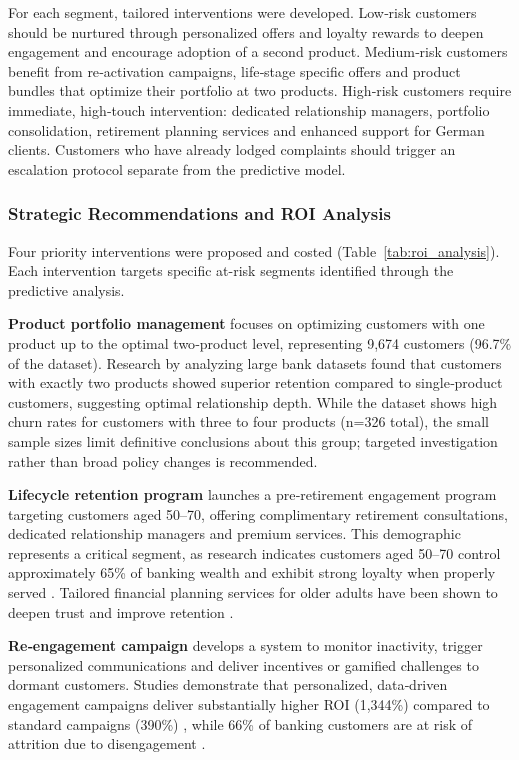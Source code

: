 \documentclass[12pt]{article}
\begin{document}
For each segment, tailored interventions were developed. Low‑risk customers should be nurtured through personalized offers and loyalty rewards to deepen engagement and encourage adoption of a second product. Medium‑risk customers benefit from re‑activation campaigns, life‑stage specific offers and product bundles that optimize their portfolio at two products. High‑risk customers require immediate, high‑touch intervention: dedicated relationship managers, portfolio consolidation, retirement planning services and enhanced support for German clients. Customers who have already lodged complaints should trigger an escalation protocol separate from the predictive model.

\subsubsection{Strategic Recommendations and ROI Analysis}
Four priority interventions were proposed and costed (Table~\ref{tab:roi_analysis}). Each intervention targets specific at-risk segments identified through the predictive analysis.

\textbf{Product portfolio management} focuses on optimizing customers with one product up to the optimal two‑product level, representing 9,674 customers (96.7\% of the dataset). Research by \citet{singh2024productchurn} analyzing large bank datasets found that customers with exactly two products showed superior retention compared to single‑product customers, suggesting optimal relationship depth. While the dataset shows high churn rates for customers with three to four products (n=326 total), the small sample sizes limit definitive conclusions about this group; targeted investigation rather than broad policy changes is recommended.

\textbf{Lifecycle retention program} launches a pre‑retirement engagement program targeting customers aged 50–70, offering complimentary retirement consultations, dedicated relationship managers and premium services. This demographic represents a critical segment, as research indicates customers aged 50–70 control approximately 65\% of banking wealth and exhibit strong loyalty when properly served \citep{marr2024aging}. Tailored financial planning services for older adults have been shown to deepen trust and improve retention \citep{ncrc2021agefriendly}.

\textbf{Re‑engagement campaign} develops a system to monitor inactivity, trigger personalized communications and deliver incentives or gamified challenges to dormant customers. Studies demonstrate that personalized, data‑driven engagement campaigns deliver substantially higher ROI (1,344\%) compared to standard campaigns (390\%) \citep{cline2024churn}, while 66\% of banking customers are at risk of attrition due to disengagement \citep{cornerstone2025dormant}.
\end{document}
